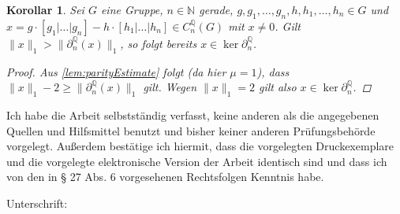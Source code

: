 \documentclass[a4paper,twoside,10pt]{scrreprt}
\newcommand{\N}{\mathbb{N}}
\newcommand{\Q}{\mathbb{Q}}
\newtheorem{korollar}[satz]{Korollar}
\theoremstyle{definition}
\begin{document}
\begin{korollar}
Sei $G$ eine Gruppe, $n\in\N$ gerade, $g,g_1,\ldots,g_n,h,h_1,\ldots,h_n\in G$ und $x=g\cdot[g_1|\ldots|g_n]-h\cdot[h_1|\ldots|h_n]\in C_n^{\Q}(G)$ mit $x\neq 0$. Gilt $\|x\|_1>\|\partial_n^{\Q}(x)\|_1$, so folgt bereits $x\in\ker\partial_n^{\Q}$.
\begin{proof}
Aus \cref{lem:parityEstimate} folgt (da hier $\mu = 1$), dass $\|x\|_1-2\geq\|\partial_n^{\Q}(x)\|_1$ gilt. Wegen $\|x\|_1=2$ gilt also $x\in\ker\partial_n^{\Q}$.
\end{proof}
\end{korollar}


\nocite{loeha}
\nocite{loehb}
\nocite{frigerio}
\printbibliography
\newpage
\cleardoublepage
\pagestyle{empty}
\noindent
Ich habe die Arbeit selbstständig verfasst, keine anderen als die angegebenen Quellen und Hilfsmittel benutzt und bisher keiner anderen Prüfungsbehörde vorgelegt. Außerdem bestätige ich hiermit, dass die vorgelegten Druckexemplare und die vorgelegte elektronische Version der Arbeit identisch sind und dass ich von den in § 27 Abs. 6 vorgesehenen Rechtsfolgen Kenntnis habe.\par\hfill\par\noindent
Unterschrift:\hspace{0.5cm} \makebox[1.5in]{\hrulefill}
\end{document}
